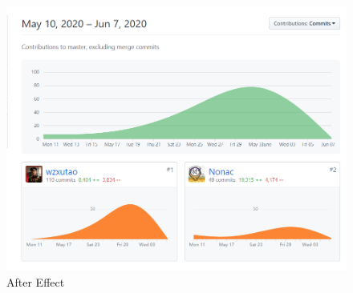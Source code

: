 \documentclass[11pt]{article}
\begin{document}
\begin{spacing}{1.0}
	\begin{figure}[H]
		\centering
		\includegraphics[scale=0.6]{figures/github.png}
		\caption{After Effect}
		\label{fig:15}
	\end{figure}
	
	
\end{spacing}	
	
\end{document}
